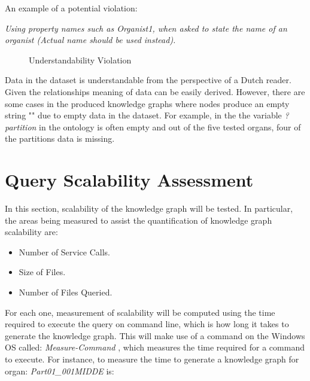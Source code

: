 \noindent An example of a potential violation: 
\vspace{-0.1cm}
\begin{displayquote}
    \textit{Using property names such as Organist1, when asked to state the name of an organist (Actual name should be used instead).}
\end{displayquote}

\begin{figure}[H]
\begin{center}
\end{center}
\vspace{-0.5cm}
\caption{Understandability Violation}
\end{figure}

Data in the dataset is understandable from the perspective of a Dutch reader. Given the relationships meaning of data can be easily derived. However, there are some cases in the produced knowledge graphs where nodes produce an empty string "" due to empty data in the dataset. For example, in the the variable \textit{?partition} in the ontology is often empty and out of the five tested organs, four of the partitions data is missing. 

\section{Query Scalability Assessment}
In this section, scalability of the knowledge graph will be tested. In particular, the areas being measured to assist the quantification of knowledge graph scalability are: 

\vspace{-0.1cm}
\begin{itemize}
\itemsep0cm
    \item Number of Service Calls.
    \vspace{-0.1cm}
    \item Size of Files.
    \vspace{-0.1cm}
    \item Number of Files Queried.
\end{itemize}
\vspace{-0.1cm}

For each one, measurement of scalability will be computed using the time required to execute the query on command line, which is how long it takes to generate the knowledge graph. This will make use of a command on the Windows OS called: \textit{Measure-Command} \cite{measurecommand}, which measures the time required for a command to execute. For instance, to measure the time to generate a knowledge graph for organ: \textit{Part01\_001MIDDE} is:


